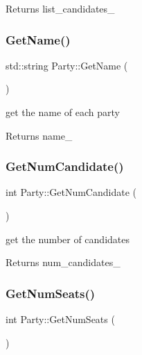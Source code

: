 \begin{DoxyReturn}{Returns}
list\+\_\+candidates\+\_\+ 
\end{DoxyReturn}
\mbox{\label{classParty_aa93fa62109fbd645de2aa75f0fce2d42}} 
\subsubsection{\texorpdfstring{Get\+Name()}{GetName()}}
{\footnotesize\ttfamily std\+::string Party\+::\+Get\+Name (\begin{DoxyParamCaption}{ }\end{DoxyParamCaption})}



get the name of each party 

\begin{DoxyReturn}{Returns}
name\+\_\+ 
\end{DoxyReturn}
\mbox{\label{classParty_a045386f85422520b6ef1f85cdba74dac}} 
\subsubsection{\texorpdfstring{Get\+Num\+Candidate()}{GetNumCandidate()}}
{\footnotesize\ttfamily int Party\+::\+Get\+Num\+Candidate (\begin{DoxyParamCaption}{ }\end{DoxyParamCaption})}



get the number of candidates 

\begin{DoxyReturn}{Returns}
num\+\_\+candidates\+\_\+ 
\end{DoxyReturn}
\mbox{\label{classParty_aa466a6724520d9e325c7d3e9e4aaeec1}} 
\subsubsection{\texorpdfstring{Get\+Num\+Seats()}{GetNumSeats()}}
{\footnotesize\ttfamily int Party\+::\+Get\+Num\+Seats (\begin{DoxyParamCaption}{ }\end{DoxyParamCaption})}



